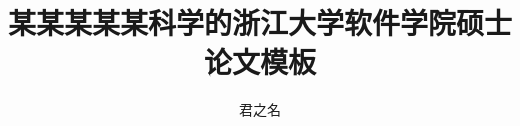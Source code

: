 \documentclass[master,oneside]{zjuthesis} %
\title{某某某某某科学的浙江大学软件学院硕士论文模板} %
\author{君之名}
\institute{软件学院}         %
\begin{document}
\maketitle

\abstractmatter



\frontmatter
\begin{spacing}{1.2}
       \tableofcontents %
       \listoffigures   %
       \listoftables    %
\end{spacing}

%

\mainmatter



\backmatter



%




\end{document}

